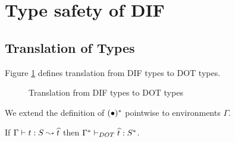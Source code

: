 \section{Type safety of DIF}

\subsection{Translation of Types}

\begin{DEFINITION}
    \label{def_translation}
    Figure \ref{fig_translation} defines translation from DIF types to DOT
    types.
\end{DEFINITION}

\begin{figure}[h]
    
    \caption{Translation from DIF types to DOT types}
    \label{fig_translation}
\end{figure}

We extend the definition of $(\bullet)^{*}$ pointwise to environments
$\Gamma$.

\begin{THEOREM}
    If $\Gamma \vdash t: S \leadsto \widehat{t}$ then
    $\Gamma^{*} \vdash_{DOT} \widehat{t}: S^{*}$.
\end{THEOREM}

